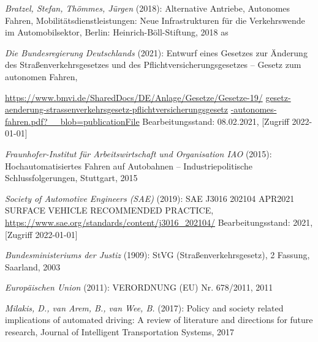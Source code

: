 \begin{thebibliography}{9}

	\textit{Bratzel, Stefan, Thömmes, Jürgen} (2018):
	Alternative Antriebe, Autonomes Fahren, Mobilitätsdienstleistungen: Neue Infrastrukturen für die Verkehrswende im Automobilsektor,
	Berlin: Heinrich-Böll-Stiftung, 2018
	as


	\textit{Die Bundesregierung Deutschlands} (2021): Entwurf eines Gesetzes zur Änderung des Straßenverkehrsgesetzes und des Pflichtversicherungsgesetzes – Gesetz zum autonomen Fahren,

	\url{https://www.bmvi.de/SharedDocs/DE/Anlage/Gesetze/Gesetze-19/}
	\url{gesetz-aenderung-strassenverkehrsgesetz-pflichtversicherungsgesetz}
	\url{-autonomes-fahren.pdf?__blob=publicationFile}
	\newline
	Bearbeitungsstand: 08.02.2021,
	[Zugriff 2022-01-01]

	\textit{Fraunhofer-Institut für Arbeitswirtschaft und Organisation IAO} (2015):
	Hochautomatisiertes Fahren auf Autobahnen – Industriepolitische Schlussfolgerungen, Stuttgart, 2015



	\textit{Society of Automotive Engineers (SAE)} (2019):
	SAE J3016 202104 APR2021 SURFACE VEHICLE
	RECOMMENDED PRACTICE,
	\url{https://www.sae.org/standards/content/j3016_202104/}
	\newline
	Bearbeitungsstand: 2021,
	[Zugriff 2022-01-01]



	\textit{Bundesministeriums der Justiz} (1909): StVG (Straßenverkehrsgesetz), 2 Fassung, Saarland, 2003

	\textit{Europäischen Union} (2011): VERORDNUNG (EU) Nr. 678/2011, 2011



	\textit{Milakis, D., van Arem, B., van Wee, B.} (2017):
	Policy and society related implications of
	automated driving: A review of literature and directions for future research, Journal of
	Intelligent Transportation Systems, 2017









\end{thebibliography}